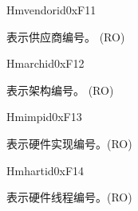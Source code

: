 
\begin{register}{H}{mvendorid}{0xF11}\label{regdesc:MVENDORID}
%
\regnewline%
\begin{regdesc}\begin{reglist}
\label{fielddesc:MVENDORID}\item [MVENDORID] 表示供应商编号。 (RO)
\end{reglist}\end{regdesc}
\end{register}

\begin{register}{H}{marchid}{0xF12}\label{regdesc:MARCHID}
%
\regnewline%
\begin{regdesc}\begin{reglist}
\label{fielddesc:MARCHID}\item [MARCHID] 表示架构编号。 (RO)
\end{reglist}\end{regdesc}
\end{register}

\begin{register}{H}{mimpid}{0xF13}\label{regdesc:MIMPID}
%
\regnewline%
\begin{regdesc}\begin{reglist}
\label{fielddesc:MIMPID}\item [MIMPID] 表示硬件实现编号。(RO)
\end{reglist}\end{regdesc}
\end{register}

\begin{register}{H}{mhartid}{0xF14}\label{regdesc:MHARTID}
%
\regnewline%
\begin{regdesc}\begin{reglist}
\label{fielddesc:MHARTID}\item [MHARTID] 表示硬件线程编号。(RO)
\end{reglist}\end{regdesc}
\end{register}

